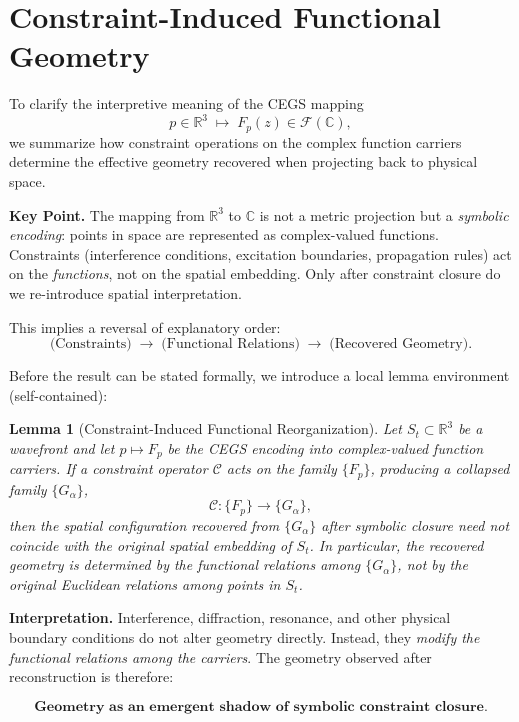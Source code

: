 \documentclass[11pt]{article}
\theoremstyle{plain}
\newtheorem{lemma}{Lemma}[section]
\theoremstyle{definition}
\theoremstyle{remark}
\begin{document}
\appendix
\section*{Constraint-Induced Functional Geometry}

\noindent To clarify the interpretive meaning of the CEGS mapping 
\[
p \in \mathbb{R}^3 \;\longmapsto\; F_{p}(z) \in \mathcal{F}(\mathbb{C}),
\]
we summarize how constraint operations on the complex function carriers determine the effective geometry recovered when projecting back to physical space.

\medskip
\noindent\textbf{Key Point.} The mapping from $\mathbb{R}^3$ to $\mathbb{C}$ is not a metric projection but a \emph{symbolic encoding}: points in space are represented as complex-valued functions. Constraints (interference conditions, excitation boundaries, propagation rules) act on the \emph{functions}, not on the spatial embedding. Only after constraint closure do we re-introduce spatial interpretation.

\medskip
\noindent This implies a reversal of explanatory order:
\[
\text{(Constraints)} \;\longrightarrow\; \text{(Functional Relations)} \;\longrightarrow\; \text{(Recovered Geometry)}.
\]

\medskip
\noindent Before the result can be stated formally, we introduce a local lemma environment (self-contained):


\begin{lemma}[Constraint-Induced Functional Reorganization]
Let $S_t \subset \mathbb{R}^3$ be a wavefront and let $p \mapsto F_p$ be the CEGS encoding into complex-valued function carriers. If a constraint operator $\mathcal{C}$ acts on the family $\{F_p\}$, producing a collapsed family $\{G_\alpha\}$,
\[
\mathcal{C}:\{F_p\} \longrightarrow \{G_\alpha\},
\]
then the spatial configuration recovered from $\{G_\alpha\}$ after symbolic closure need not coincide with the original spatial embedding of $S_t$. In particular, the recovered geometry is determined by the \emph{functional relations} among $\{G_\alpha\}$, not by the original Euclidean relations among points in $S_t$.
\end{lemma}


\medskip
\noindent\textbf{Interpretation.}  
Interference, diffraction, resonance, and other physical boundary conditions do not alter geometry directly.  
Instead, they \emph{modify the functional relations among the carriers}.  
The geometry observed after reconstruction is therefore:

\[
\textbf{Geometry as an emergent shadow of symbolic constraint closure.}
\]
\end{document}
